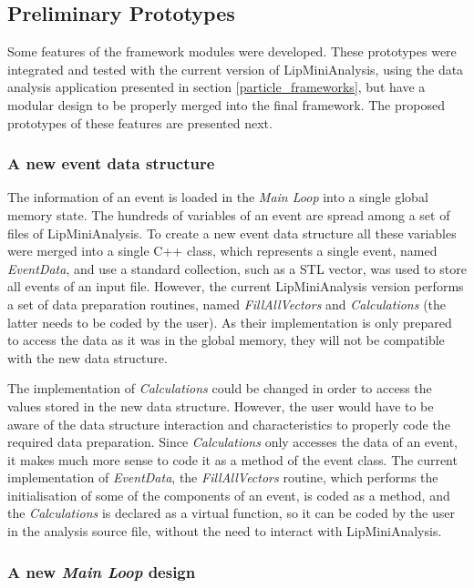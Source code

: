 \subsection{Preliminary Prototypes}
\label{work_so_far}

Some features of the framework modules were developed. These prototypes were integrated and tested with the current version of LipMiniAnalysis, using the \ttH data analysis application presented in section \ref{particle_frameworks}, but have a modular design to be properly merged into the final framework. The proposed prototypes of these features are presented next.

\subsubsection*{A new event data structure}

The information of an event is loaded in the \textit{Main Loop} into a single global memory state. The hundreds of variables of an event are spread among a set of files of LipMiniAnalysis. To create a new event data structure all these variables were merged into a single C++ class, which represents a single event, named \textit{EventData}, and use a standard collection, such as a STL vector, was used to store all events of an input file. However, the current LipMiniAnalysis version performs a set of data preparation routines, named \textit{FillAllVectors} and \textit{Calculations} (the latter needs to be coded by the user). As their implementation is only prepared to access the data as it was in the global memory, they will not be compatible with the new data structure. 

The implementation of \textit{Calculations} could be changed in order to access the values stored in the new data structure. However, the user would have to be aware of the data structure interaction and characteristics to properly code the required data preparation. Since \textit{Calculations} only accesses the data of an event, it makes much more sense to code it as a method of the event class. The current implementation of \textit{EventData}, the \textit{FillAllVectors} routine, which performs the initialisation of some of the components of an event, is coded as a method, and the \textit{Calculations} is declared as a virtual function, so it can be coded by the user in the analysis source file, without the need to interact with LipMiniAnalysis.

\subsubsection*{A new \textit{Main Loop} design}

